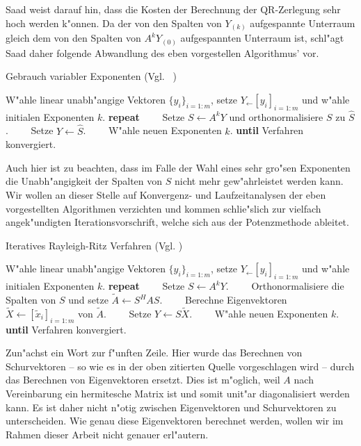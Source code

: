 Saad weist darauf hin, dass die Kosten der Berechnung der QR-Zerlegung sehr hoch werden k"onnen. Da der von den Spalten von $Y_{(k)}$ aufgespannte Unterraum gleich dem von den Spalten von $A^k Y_{(0)}$ aufgespannten Unterraum ist, schl"agt Saad daher folgende Abwandlung des eben vorgestellen Algorithmus' vor.

\begin{algorithm}
\caption{Gebrauch variabler Exponenten (Vgl. ~\cite[Algorithmus 5.2, 116]{saad})}\label{alg:chap4:potentePotenz}
\begin{algorithmic}[1]
\State W"ahle linear unabh"angige Vektoren $\{y_i\}_{i=1:m}$, setze $Y_\gets[y_i]_{i=1:m}$ und w"ahle initialen Exponenten $k$.
\State \textbf{repeat}
\State \ \ \ \ Setze $S \gets A^kY$ und orthonormalisiere $S$ zu $\widehat{S}$.
\State \ \ \ \ Setze $Y \gets \widehat{S}$.
\State \ \ \ \ W"ahle neuen Exponenten $k$.
\State \textbf{until} Verfahren konvergiert.
\end{algorithmic}
\end{algorithm}

Auch hier ist zu beachten, dass im Falle der Wahl eines sehr gro"sen Exponenten die Unabh"angigkeit der Spalten von $S$ nicht mehr gew"ahrleistet werden kann.
Wir wollen an dieser Stelle auf Konvergenz- und Laufzeitanalysen der eben vorgestellten Algorithmen verzichten und kommen schlie"slich zur vielfach angek"undigten Iterationsvorschrift, welche sich aus der Potenzmethode ableitet.

\newpage

\begin{algorithm}
\caption{Iteratives Rayleigh-Ritz Verfahren (Vgl. \cite[Algorithmus 5.3, 118]{saad})}\label{alg:chap4:rrIteration}
\begin{algorithmic}[1]
\State W"ahle linear unabh"angige Vektoren $\{y_i\}_{i=1:m}$, setze $Y_\gets[y_i]_{i=1:m}$ und w"ahle initialen Exponenten $k$.
\State \textbf{repeat}
\State \ \ \ \ Setze $S \gets A^k Y$.
\State \ \ \ \ Orthonormalisiere die Spalten von $S$ und setze $\widetilde{A} \gets S^H A S$.
\State \ \ \ \ Berechne Eigenvektoren $\widetilde{X} \gets [\widetilde{x}_i]_{i=1:m}$ von $\widetilde{A}$.
\State \ \ \ \ Setze $Y \gets S \widetilde{X}$.
\State \ \ \ \ W"ahle neuen Exponenten $k$.
\State \textbf{until} Verfahren konvergiert.
\end{algorithmic}
\end{algorithm}

Zun"achst ein Wort zur f"unften Zeile. Hier wurde das Berechnen von Schurvektoren -- so wie es in der oben zitierten Quelle vorgeschlagen wird -- durch das Berechnen von Eigenvektoren ersetzt. Dies ist m"oglich, weil $A$ nach Vereinbarung ein hermitesche Matrix ist und somit unit"ar diagonalisiert werden kann. Es ist daher nicht n"otig zwischen Eigenvektoren und Schurvektoren zu unterscheiden. Wie genau diese Eigenvektoren berechnet werden, wollen wir im Rahmen dieser Arbeit nicht genauer erl"autern.\\

